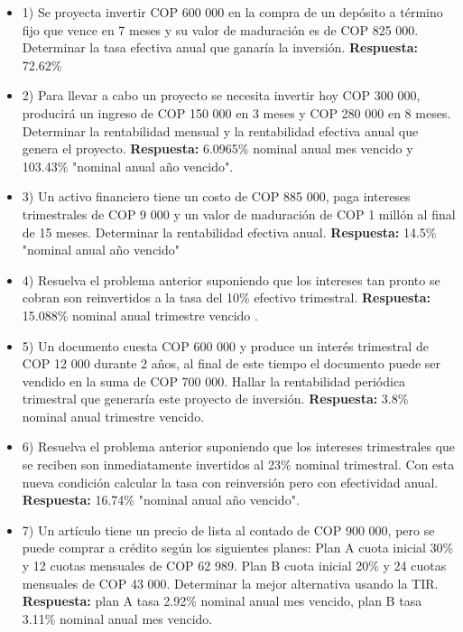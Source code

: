 \begin{itemize}

 \item 1) Se proyecta invertir COP 600 000 en la compra de un depósito a término fijo que vence en 7 meses y su valor de maduración es de COP 825 000. Determinar la tasa efectiva anual que ganaría la inversión.
       \textbf{ Respuesta:} 72.62\%

 \item 2) Para llevar a cabo un proyecto se necesita invertir hoy COP 300 000, producirá un ingreso de COP 150 000 en 3 meses y COP 280 000 en 8 meses. Determinar la rentabilidad mensual y la rentabilidad efectiva anual que genera el proyecto.
       \textbf{ Respuesta:} 6.0965\% nominal anual mes vencido  y 103.43\% "nominal anual año vencido".

 \item 3) Un activo financiero tiene un costo de COP 885 000, paga intereses trimestrales de COP 9 000 y un valor de maduración de COP 1 millón al final de 15 meses. Determinar la rentabilidad efectiva anual.
       \textbf{ Respuesta:} 14.5\% "nominal anual año vencido"

 \item 4) Resuelva el problema anterior suponiendo que los intereses tan pronto se cobran son reinvertidos a la tasa del 10\% efectivo trimestral.
       \textbf{ Respuesta:} 15.088\% nominal anual trimestre vencido .

 \item 5) Un documento cuesta COP 600 000 y produce un interés trimestral de COP 12 000 durante 2 años, al final de este tiempo el documento puede ser vendido en la suma de COP 700 000. Hallar la rentabilidad periódica trimestral que generaría este proyecto de inversión.
       \textbf{ Respuesta:} 3.8\% nominal anual trimestre vencido.

 \item 6) Resuelva el problema anterior suponiendo que los intereses trimestrales que se reciben son inmediatamente invertidos al 23\% nominal trimestral. Con esta nueva condición calcular la tasa con reinversión pero con efectividad anual.
       \textbf{ Respuesta:} 16.74\% "nominal anual año vencido".

 \item 7) Un artículo tiene un precio de lista al contado de COP 900 000, pero se puede comprar a crédito según los siguientes planes: Plan A cuota inicial 30\% y 12 cuotas mensuales de COP 62 989. Plan B cuota inicial 20\% y 24 cuotas mensuales de COP 43 000. Determinar la mejor alternativa usando la TIR.
       \textbf{ Respuesta:} plan A tasa 2.92\% nominal anual mes vencido, plan B tasa 3.11\% nominal anual mes vencido.


\end{itemize}
